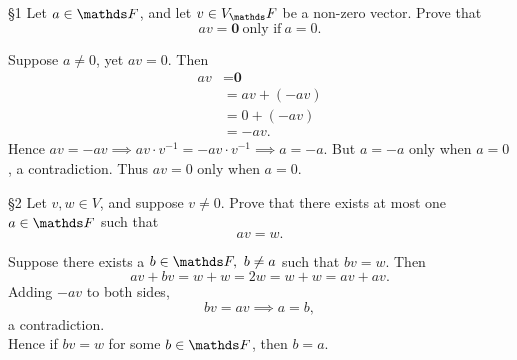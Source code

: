 \documentclass{homework}
\begin{document}
\begin{problem}{\S 1}
  Let $a\in \F$, and let $v\in V_\F$ be a non-zero vector. Prove that \[
    av=\textbf{0} ~\text{only if}~ a=0
  .\] 
\end{problem}

\begin{solution}
  Suppose $ a\neq 0$, yet $av=0$. Then
  \begin{align*}
    av &= \textbf{0} \\
       &= av+(-av) \\
       &= 0 + (-av) \\
       &= -av
  .\end{align*}
  Hence $av=-av \implies av\cdot v^{-1}=-av\cdot v^{-1}\implies a=-a$. But $a=-a$ only when $a=0$, a
  contradiction. Thus $av=0$ only when $a=0$.
\end{solution}


\begin{problem}{\S 2}
  Let $v,w\in V$, and suppose $v\neq 0$. Prove that there exists at most one  $a\in \F$ such that \[
    av = w
  .\] 
\end{problem}

\begin{solution}
  Suppose there exists a $b\in \F,\ b\neq a$ such that $bv=w$. Then \[
    av+bv = w + w = 2w = w + w = av + av
  .\] Adding $-av$ to both sides, \[
    bv = av \implies a = b
  ,\] a contradiction. \\
  Hence if $bv=w$ for some $b\in \F$, then $b=a$.
\end{solution}
\end{document}
